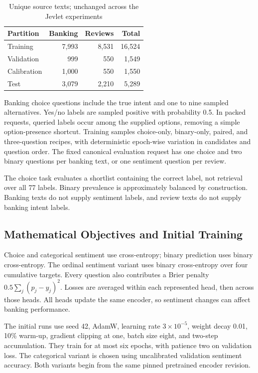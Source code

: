 \documentclass[conference]{IEEEtran}
\begin{document}
\begin{table}[t]
\caption{Unique source texts; unchanged across the Jevlet experiments}
\label{tab:data}\centering
\begin{tabular}{lrrr}\toprule
Partition & Banking & Reviews & Total\\\midrule
Training & 7,993 & 8,531 & 16,524\\
Validation & 999 & 550 & 1,549\\
Calibration & 1,000 & 550 & 1,550\\
Test & 3,079 & 2,210 & 5,289\\\bottomrule
\end{tabular}\end{table}

Banking choice questions include the true intent and one to nine sampled alternatives. Yes/no labels are sampled positive with probability 0.5. In packed requests, queried labels occur among the supplied options, removing a simple option-presence shortcut. Training samples choice-only, binary-only, paired, and three-question recipes, with deterministic epoch-wise variation in candidates and question order. The fixed canonical evaluation request has one choice and two binary questions per banking text, or one sentiment question per review.

The choice task evaluates a shortlist containing the correct label, not retrieval over all 77 labels. Binary prevalence is approximately balanced by construction. Banking texts do not supply sentiment labels, and review texts do not supply banking intent labels.

\subsection{Mathematical Objectives and Initial Training}
Choice and categorical sentiment use cross-entropy; binary prediction uses binary cross-entropy. The ordinal sentiment variant uses binary cross-entropy over four cumulative targets. Every question also contributes a Brier penalty $0.5\sum_j(p_j-y_j)^2$. Losses are averaged within each represented head, then across those heads. All heads update the same encoder, so sentiment changes can affect banking performance.

The initial runs use seed 42, AdamW, learning rate $3\times10^{-5}$, weight decay 0.01, 10\% warm-up, gradient clipping at one, batch size eight, and two-step accumulation. They train for at most six epochs, with patience two on validation loss. The categorical variant is chosen using uncalibrated validation sentiment accuracy. Both variants begin from the same pinned pretrained encoder revision.
\end{document}

